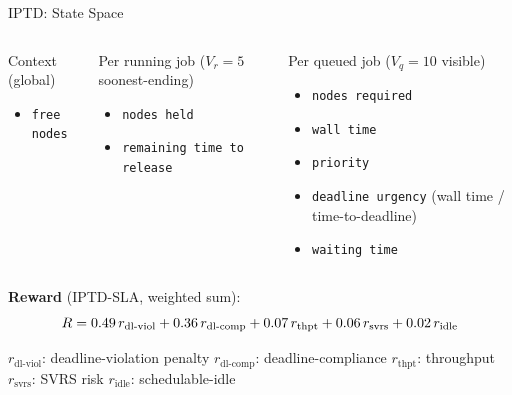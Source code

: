 \begin{frame}{IPTD: State Space}
  \begin{columns}[T,onlytextwidth]
      \begin{block}{Context (global)}
        \footnotesize
        \begin{itemize}\setlength\itemsep{2pt}
          \item \texttt{free nodes}
        \end{itemize}
      \end{block}
    \begin{block}{Per running job \;(\textcolor{SoftCoral}{$V_r=5$} soonest-ending)}
        \footnotesize
        \begin{itemize}\setlength\itemsep{2pt}
          \item \texttt{nodes held}
          \item \texttt{remaining time to release}
        \end{itemize}
      \end{block}
      \begin{block}{Per queued job \;(\textcolor{SoftCoral}{$V_q=10$} visible)}
        \footnotesize
        \begin{itemize}\setlength\itemsep{2pt}
          \item \texttt{nodes required}
          \item \texttt{wall time}
          \item \texttt{priority}
          \item \texttt{deadline urgency}  (wall time / time-to-deadline)
          \item \texttt{waiting time} 
        \end{itemize}
      \end{block}
  \end{columns}

  \vspace{0.3em}
  \centering

  \vspace{0.5em}
  {\footnotesize\textcolor{DeepBlue}{\textbf{Reward} (IPTD-SLA, weighted sum):}}
  \[
    \footnotesize
    R = 0.49\,r_{\text{dl-viol}} + 0.36\,r_{\text{dl-comp}}
      + 0.07\,r_{\text{thpt}} + 0.06\,r_{\text{svrs}}
      + 0.02\,r_{\text{idle}}
  \]

  {\scriptsize\textcolor{DeepBlue!75!black}{%
    $r_{\text{dl-viol}}$: deadline-violation penalty \quad
    $r_{\text{dl-comp}}$: deadline-compliance \quad
    $r_{\text{thpt}}$: throughput \quad
    $r_{\text{svrs}}$: SVRS risk \quad
    $r_{\text{idle}}$: schedulable-idle}}
\end{frame}

